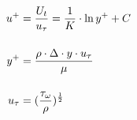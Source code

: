 \documentclass{article}
\begin{document}
\begin{subequations}
\setlength{\jot}{15pt}
    \begin{align}
        u^+ &= \frac{U_t}{u_\tau} = \frac{1}{K} \cdot \ln{y^+} + C\\
        y^+ &= \frac{\rho \cdot \Delta \cdot y \cdot u_\tau}{\mu} \\
        u_\tau &= (\frac{\tau_\omega}{\rho})^{\frac{1}{2}}
        \end{align}  
\end{subequations}
\end{document}

